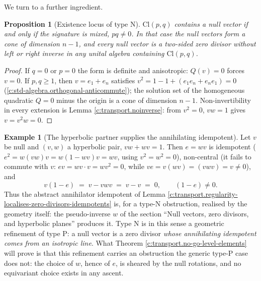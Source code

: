 \documentclass[11pt]{article}
\newtheorem{proposition}[theorem]{Proposition}
\theoremstyle{definition}
\newtheorem{example}[theorem]{Example}
\theoremstyle{plain}
\providecommand{\Cl}{}\renewcommand{\Cl}{\mathrm{Cl}}
\begin{document}
We turn to a further ingredient.

\begin{proposition}[Existence locus of type N]\label{c:transport.existence-locus-type-n}
$\Cl(p,q)$ contains a null vector if and only if the signature is mixed, $pq \neq 0$. In that case the null vectors form a cone of dimension $n - 1$, and every null vector is a two-sided zero divisor without left or right inverse in any unital algebra containing $\Cl(p,q)$.
\end{proposition}
\begin{proof}
If $q = 0$ or $p = 0$ the form is definite and anisotropic: $Q(v) = 0$ forces $v = 0$. If $p, q \geq 1$, then $v = e_1 + e_n$ satisfies $v^2 = 1 - 1 + (e_1e_n + e_ne_1) = 0$ (\ref{c:std-algebra.orthogonal-anticommute}); the solution set of the homogeneous quadratic $Q = 0$ minus the origin is a cone of dimension $n-1$. Non-invertibility in every extension is Lemma \ref{c:transport.noinverse}: from $v^2 = 0$, $vw = 1$ gives $v = v^2 w = 0$.

\end{proof}

\begin{example}[The hyperbolic partner supplies the annihilating idempotent]\label{c:note.transport.hyperbolic-partner-supplies-annihilating-idempotent}
Let $v$ be null and $(v, w)$ a hyperbolic pair, $vw + wv = 1$. Then $e = wv$ is idempotent ($e^2 = w(vw)v = w(1 - wv)v = wv$, using $v^2 = w^2 = 0$), non-central (it fails to commute with $v$: $ev = wv\cdot v = wv^2 = 0$, while $ve = v(wv) = (vwv) = v \neq 0$), and
\[
v(1 - e)\;=\;v - vwv \;=\; v - v \;=\; 0 , \qquad (1-e) \ne 0.
\]
Thus the abstract annihilator idempotent of Lemma \ref{c:transport.regularity-localises-zero-divisors-idempotents} is, for a type-N obstruction, realised by the geometry itself: the pseudo-inverse $w$ of the section ``Null vectors, zero divisors, and hyperbolic planes'' produces it. Type N is in this sense a geometric refinement of type P: a null vector is a zero divisor \emph{whose annihilating idempotent comes from an isotropic line}. What Theorem \ref{c:transport.no-go-level-elements} will prove is that this refinement carries an obstruction the generic type-P case does not: the choice of $w$, hence of $e$, is sheared by the null rotations, and no equivariant choice exists in any ascent.
\end{example}
\end{document}
